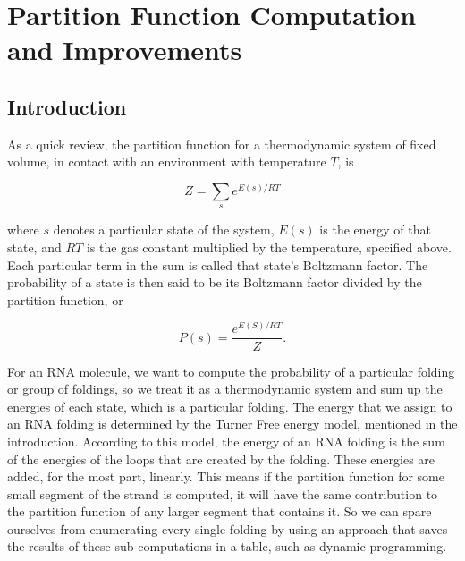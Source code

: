 \chapter{Partition Function Computation and Improvements}
\section{Introduction}

As a quick review, the partition function for a thermodynamic system
of fixed volume, in contact with an environment with temperature $T$,
is

\begin{equation} Z = \sum_s e^{E(s)/ RT } \end{equation}

where $s$ denotes a particular state of the system, $E(s)$ is the
energy of that state, and $RT$ is the gas constant multiplied by the
temperature, specified above. Each particular term in the sum is
called that state's Boltzmann factor. The probability of a state is
then said to be its Boltzmann factor divided by the partition
function, or

\begin{equation} P(s) = \frac{e^{E(S)/RT}}{Z}.  \end{equation}

For an RNA molecule, we want to compute the probability of a
particular folding or group of foldings, so we treat it as a
thermodynamic system and sum up the energies of each state, which is a
particular folding. The energy that we assign to an RNA folding is
determined by the Turner Free energy model, mentioned in the
introduction. According to this model, the energy of an RNA folding is
the sum of the energies of the loops that are created by the
folding. These energies are added, for the most part, linearly. This
means if the partition function for some small segment of the strand
is computed, it will have the same contribution to the partition
function of any larger segment that contains it. So we can spare
ourselves from enumerating every single folding by using an approach
that saves the results of these sub-computations in a table, such as
dynamic programming.

